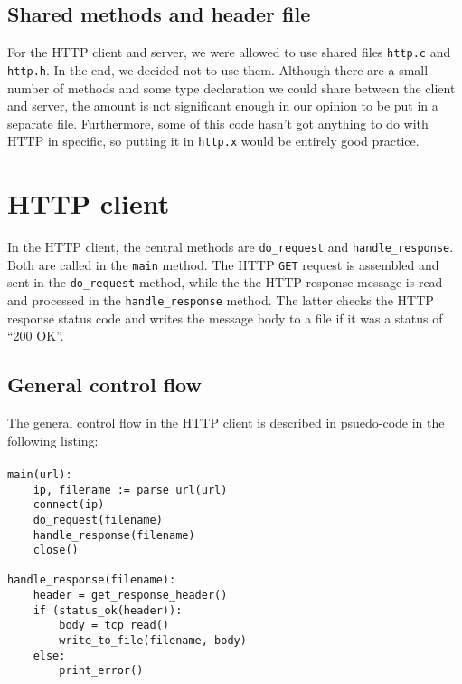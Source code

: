 \documentclass[11pt]{article}
\begin{document}
\subsection{Shared methods and header file}

For the HTTP client and server, we were allowed to use shared files
\lstinline|http.c| and \lstinline|http.h|. In the end, we decided not to use
them. Although there are a small number of methods and some type declaration
we could share between the client and server, the amount is not significant
enough in our opinion to be put in a separate file. Furthermore, some of this
code hasn't got anything to do with HTTP in specific, so putting it in
\lstinline|http.x| would be entirely good practice.


\section{HTTP client}

In the HTTP client, the central methods are \lstinline|do_request| and
\lstinline|handle_response|. Both are called in the \lstinline|main|
method. The HTTP \lstinline|GET| request is assembled and sent in the
\lstinline|do_request| method, while the the HTTP response message is read and
processed in the \lstinline|handle_response| method. The latter checks the
HTTP response status code and writes the message body to a file if it was a
status of ``200 OK''.


\subsection{General control flow}

The general control flow in the HTTP client is described in psuedo-code in the
following listing:

\paragraph{}

\begin{lstlisting}[title=HTTP client control flow]
main(url):
    ip, filename := parse_url(url)
    connect(ip)
    do_request(filename)
    handle_response(filename)
    close()

handle_response(filename):
    header = get_response_header()
    if (status_ok(header)):
        body = tcp_read()
        write_to_file(filename, body)
    else:
        print_error()
\end{lstlisting}
\end{document}

